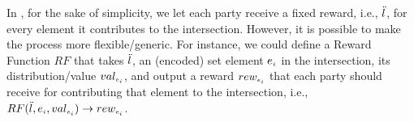 In \epsi, for the sake of simplicity, we let each party receive a fixed reward, i.e., $\ddot{l}$, for every element it contributes to the intersection. However, it is possible to make the process more flexible/generic. For instance, we could define a Reward Function $RF$ that takes $\ddot{l}$, an (encoded) set element $e_{\scriptscriptstyle i}$ in the intersection, its distribution/value $val_{\scriptscriptstyle e_{\scriptscriptstyle i}}$, and output a reward $rew_{\scriptscriptstyle e_{\scriptscriptstyle i}}$ that each party should receive for contributing that element to the intersection, i.e., $RF(\ddot{l}, e_{\scriptscriptstyle i}, val_{\scriptscriptstyle e_{\scriptscriptstyle i}})\rightarrow rew_{\scriptscriptstyle e_{\scriptscriptstyle i}}$. 



%









